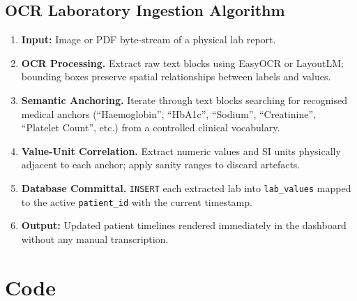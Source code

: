 \documentclass[12pt,a4paper]{article}
\begin{document}
\subsection{OCR Laboratory Ingestion Algorithm}
\begin{enumerate}[label=\textbf{Step \arabic*.}, leftmargin=*, itemsep=3pt]
  \item \textbf{Input:}  Image or PDF byte-stream of a physical lab report.
  \item \textbf{OCR Processing.}  Extract raw text blocks using EasyOCR or
        LayoutLM; bounding boxes preserve spatial relationships between labels and values.
  \item \textbf{Semantic Anchoring.}  Iterate through text blocks searching for
        recognised medical anchors (``Haemoglobin'', ``HbA1c'', ``Sodium'', ``Creatinine'',
        ``Platelet Count'', etc.) from a controlled clinical vocabulary.
  \item \textbf{Value-Unit Correlation.}  Extract numeric values and SI units
        physically adjacent to each anchor; apply sanity ranges to discard artefacts.
  \item \textbf{Database Committal.}  \texttt{INSERT} each extracted lab into
        \texttt{lab\_values} mapped to the active \texttt{patient\_id} with the current
        timestamp.
  \item \textbf{Output:}  Updated patient timelines rendered immediately in the
        dashboard without any manual transcription.
\end{enumerate}

\section{Code}
\end{document}
